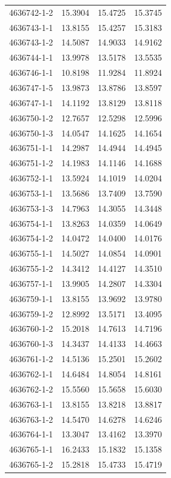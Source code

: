 \begin{longtable}{lrrr}
4636742-1-2 & 15.3904 & 15.4725 & 15.3745 \\
4636743-1-1 & 13.8155 & 15.4257 & 15.3183 \\
4636743-1-2 & 14.5087 & 14.9033 & 14.9162 \\
4636744-1-1 & 13.9978 & 13.5178 & 13.5535 \\
4636746-1-1 & 10.8198 & 11.9284 & 11.8924 \\
4636747-1-5 & 13.9873 & 13.8786 & 13.8597 \\
4636747-1-1 & 14.1192 & 13.8129 & 13.8118 \\
4636750-1-2 & 12.7657 & 12.5298 & 12.5996 \\
4636750-1-3 & 14.0547 & 14.1625 & 14.1654 \\
4636751-1-1 & 14.2987 & 14.4944 & 14.4945 \\
4636751-1-2 & 14.1983 & 14.1146 & 14.1688 \\
4636752-1-1 & 13.5924 & 14.1019 & 14.0204 \\
4636753-1-1 & 13.5686 & 13.7409 & 13.7590 \\
4636753-1-3 & 14.7963 & 14.3055 & 14.3448 \\
4636754-1-1 & 13.8263 & 14.0359 & 14.0649 \\
4636754-1-2 & 14.0472 & 14.0400 & 14.0176 \\
4636755-1-1 & 14.5027 & 14.0854 & 14.0901 \\
4636755-1-2 & 14.3412 & 14.4127 & 14.3510 \\
4636757-1-1 & 13.9905 & 14.2807 & 14.3304 \\
4636759-1-1 & 13.8155 & 13.9692 & 13.9780 \\
4636759-1-2 & 12.8992 & 13.5171 & 13.4095 \\
4636760-1-2 & 15.2018 & 14.7613 & 14.7196 \\
4636760-1-3 & 14.3437 & 14.4133 & 14.4663 \\
4636761-1-2 & 14.5136 & 15.2501 & 15.2602 \\
4636762-1-1 & 14.6484 & 14.8054 & 14.8161 \\
4636762-1-2 & 15.5560 & 15.5658 & 15.6030 \\
4636763-1-1 & 13.8155 & 13.8218 & 13.8817 \\
4636763-1-2 & 14.5470 & 14.6278 & 14.6246 \\
4636764-1-1 & 13.3047 & 13.4162 & 13.3970 \\
4636765-1-1 & 16.2433 & 15.1832 & 15.1358 \\
4636765-1-2 & 15.2818 & 15.4733 & 15.4719 \\

\end{longtable}
